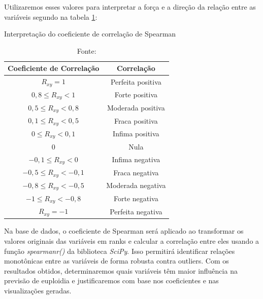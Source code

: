 \begin{apendicesenv}
Utilizaremos esses valores para interpretar a força e a direção da relação entre as variáveis segundo  na tabela \ref{tab:correlacao_pearson}:

\begin{table}[h!]
  \centering
  \captionsetup{font=footnotesize, justification=centering, labelsep=period, position=above}
  \caption{ Interpretação do coeficiente de correlação de Spearman}
  \label{tab:correlacao_pearson}
  \begin{tabular}{|c|c|}
  \hline
  \vspace{0.2cm} \cellcolor[HTML]{C0C0C0} \textbf{Coeficiente de Correlação} & \cellcolor[HTML]{C0C0C0} \textbf{Correlação} \\
  \hline
  $R_{xy} = 1$ & Perfeita positiva \\
  \hline
  $0,8 \leq R_{xy} < 1$ & Forte positiva \\
  \hline
  $0,5 \leq R_{xy} < 0,8$ & Moderada positiva \\
  \hline
  $0,1 \leq R_{xy} < 0,5$ & Fraca positiva \\
  \hline
  $0 \leq R_{xy} < 0,1$ & Infima positiva \\
  \hline
  $0$ & Nula \\
  \hline
  $-0,1 \leq R_{xy} < 0$ & Infima negativa \\
  \hline
  $-0,5 \leq R_{xy} < -0,1$ & Fraca negativa \\
  \hline
  $-0,8 \leq R_{xy} < -0,5$ & Moderada negativa \\
  \hline
  $-1 \leq R_{xy} < -0,8$ & Forte negativa \\
  \hline
  $R_{xy} = -1$ & Perfeita negativa \\
  \hline
  \end{tabular}
  \caption*{\scriptsize Fonte: \cite{santos2007}}
\end{table}

Na base de dados, o coeficiente de Spearman será aplicado ao transformar os valores originais das variáveis em ranks e calcular a correlação entre eles usando a função \textit{spearmanr()} da biblioteca \textit{SciPy}. Isso permitirá identificar relações monotônicas entre as variáveis de forma robusta contra outliers. Com os resultados obtidos, determinaremos quais variáveis têm maior influência na previsão de euploidia e justificaremos com base nos coeficientes e nas visualizações geradas.

\end{apendicesenv}
